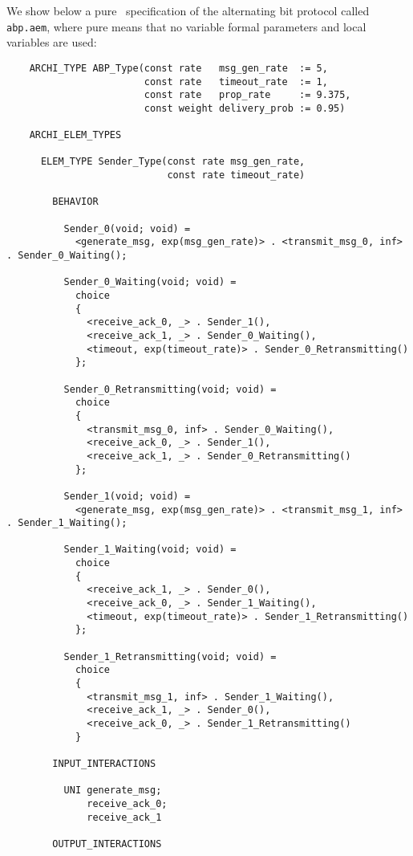 We show below a pure \aemilia\ specification of the alternating bit protocol called {\tt abp.aem}, where
pure means that no variable formal parameters and local variables are used:

	\begin{verbatim}
    ARCHI_TYPE ABP_Type(const rate   msg_gen_rate  := 5,
                        const rate   timeout_rate  := 1,
                        const rate   prop_rate     := 9.375,
                        const weight delivery_prob := 0.95)

    ARCHI_ELEM_TYPES

      ELEM_TYPE Sender_Type(const rate msg_gen_rate,
                            const rate timeout_rate)

        BEHAVIOR

          Sender_0(void; void) =
            <generate_msg, exp(msg_gen_rate)> . <transmit_msg_0, inf> . Sender_0_Waiting();

          Sender_0_Waiting(void; void) =
            choice
            {
              <receive_ack_0, _> . Sender_1(),
              <receive_ack_1, _> . Sender_0_Waiting(),
              <timeout, exp(timeout_rate)> . Sender_0_Retransmitting()
            };

          Sender_0_Retransmitting(void; void) =
            choice
            {
              <transmit_msg_0, inf> . Sender_0_Waiting(),
              <receive_ack_0, _> . Sender_1(),
              <receive_ack_1, _> . Sender_0_Retransmitting()
            };

          Sender_1(void; void) =
            <generate_msg, exp(msg_gen_rate)> . <transmit_msg_1, inf> . Sender_1_Waiting();

          Sender_1_Waiting(void; void) =
            choice
            {
              <receive_ack_1, _> . Sender_0(),
              <receive_ack_0, _> . Sender_1_Waiting(),
              <timeout, exp(timeout_rate)> . Sender_1_Retransmitting()
            };

          Sender_1_Retransmitting(void; void) =
            choice
            {
              <transmit_msg_1, inf> . Sender_1_Waiting(),
              <receive_ack_1, _> . Sender_0(),
              <receive_ack_0, _> . Sender_1_Retransmitting()
            }

        INPUT_INTERACTIONS

          UNI generate_msg;
              receive_ack_0;
              receive_ack_1

        OUTPUT_INTERACTIONS


\end{verbatim}
